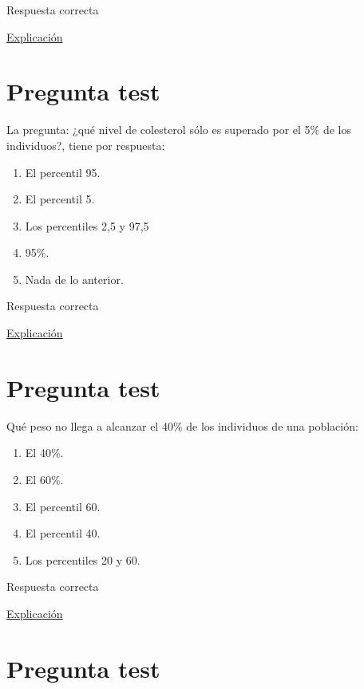 \documentclass[
]{book}
\providecommand{\tightlist}{%
  \setlength{\itemsep}{0pt}\setlength{\parskip}{0pt}}
\begin{document}
Respuesta correcta

\href{https://1fjmanzano.github.io/bioestadistica/medidas-de-forma.html}{Explicación}

\hypertarget{pregunta-test-58}{%
\section{Pregunta test}\label{pregunta-test-58}}

La pregunta: ¿qué nivel de colesterol sólo es superado por el 5\% de los individuos?, tiene por respuesta:

\begin{enumerate}
\def\labelenumi{\alph{enumi})}
\tightlist
\item
  El percentil 95.
\item
  El percentil 5.
\item
  Los percentiles 2,5 y 97,5
\item
  95\%.
\item
  Nada de lo anterior.
\end{enumerate}

Respuesta correcta

\href{https://1fjmanzano.github.io/bioestadistica/medidas-de-posicio\%CC\%81n-dispersio\%CC\%81n-y-forma.html\#medidas-de-posicio\%CC\%81n-no-centrales}{Explicación}

\hypertarget{pregunta-test-59}{%
\section{Pregunta test}\label{pregunta-test-59}}

Qué peso no llega a alcanzar el 40\% de los individuos de una población:

\begin{enumerate}
\def\labelenumi{\alph{enumi})}
\tightlist
\item
  El 40\%.
\item
  El 60\%.
\item
  El percentil 60.
\item
  El percentil 40.
\item
  Los percentiles 20 y 60.
\end{enumerate}

Respuesta correcta

\href{https://1fjmanzano.github.io/bioestadistica/medidas-de-posicio\%CC\%81n-dispersio\%CC\%81n-y-forma.html\#medidas-de-posicio\%CC\%81n-no-centrales}{Explicación}

\hypertarget{pregunta-test-60}{%
\section{Pregunta test}\label{pregunta-test-60}}
\end{document}
